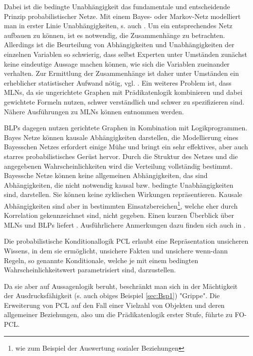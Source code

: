 \documentclass[a4paper, 11pt]{book}
\begin{document}
Dabei ist die bedingte Unabhängigkeit das fundamentale und entscheidende Prinzip probabilistischer Netze. Mit einem Bayes- oder Markov-Netz modelliert man in erster Linie Unabhängigkeiten, s. auch \cite[Kap. 12.1 und 12.2]{BKI08}. Um ein entsprechendes Netz aufbauen zu können, ist es notwendig, die Zusammenhänge zu betrachten. Allerdings ist die Beurteilung von Abhängigkeiten und Unabhängigkeiten der einzelnen Variablen so schwierig, dass selbst Experten unter Umständen zunächst keine eindeutige Aussage machen können, wie sich die Variablen zueinander verhalten. Zur Ermittlung der Zusammenhänge ist daher unter Umständen ein erheblicher statistischer Aufwand nötig, vgl. \cite[12.6, S. 402 /403]{BKI08}.
 Ein weiteres Problem ist, dass MLNs, da sie ungerichtete Graphen mit Prädikatenlogik kombinieren und dabei gewichtete Formeln nutzen, schwer verständlich und schwer zu spezifizieren sind. Nähere Ausführungen zu MLNs können \cite{DR06} entnommen werden. 
 
 BLPs dagegen nutzen gerichtete Graphen in Kombination mit Logikprogrammen. Bayes Netze können kausale Abhängigkeiten darstellen, die Modellierung eines Bayesschen Netzes erfordert einige Mühe und bringt ein sehr effektives, aber auch starres probabilistisches Gerüst hervor. Durch die Struktur des Netzes und die angegebenen Wahrscheinlichkeiten wird die Verteilung vollständig bestimmt. Bayessche Netze können keine allgemeinen Abhängigkeiten, das sind Abhängigkeiten, die nicht notwendig kausal bzw. bedingte Unabhängigkeiten sind, darstellen. Sie können keine zyklischen Wirkungen repräsentieren. Kausale Abhängigkeiten sind aber in bestimmten Einsatzbereichen\footnote {wie zum Beispiel der Auswertung sozialer Beziehungen}, welche eher durch Korrelation gekennzeichnet sind, nicht gegeben.
 Einen kurzen Überblick über MLNs und BLPs liefert \cite[Kap. 2.1 und 2.2]{FLT09}.
Ausführlichere Anmerkungen dazu finden sich auch in \cite[Kap. 2]{KIBFT11}.

Die probabilistische Konditionallogik PCL  erlaubt eine Repräsentation unsicheren Wissens, in dem sie ermöglicht,  unsichere Fakten und unsichere wenn-dann Regeln, so genannte Konditionale, welche je mit einem bedingten Wahrscheinlichkeitswert parametrisiert sind, darzustellen. 

Da sie aber auf Aussagenlogik beruht, beschränkt man sich in der Mächtigkeit der Ausdrucksfähigkeit (s. auch obiges Beispiel \ref{sec:Bsp1}) "{}Grippe"{}. Die Erweiterung von PCL auf den Fall einer Vielzahl von Objekten und deren allgemeiner Beziehungen, also um die Prädikatenlogik erster Stufe, führte zu FO-PCL.
\end{document}
